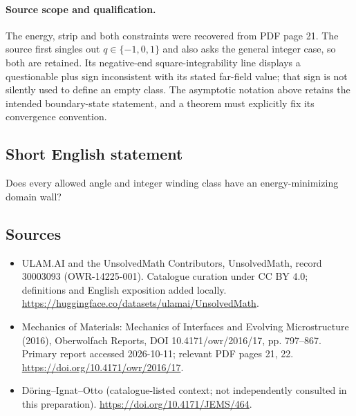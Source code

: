 \documentclass[11pt]{article}
\begin{document}
\paragraph{Source scope and qualification.}
The energy, strip and both constraints were recovered from PDF page 21. The source first singles out $q\in\{-1,0,1\}$ and also asks the general integer case, so both are retained. Its negative-end square-integrability line displays a questionable plus sign inconsistent with its stated far-field value; that sign is not silently used to define an empty class. The asymptotic notation above retains the intended boundary-state statement, and a theorem must explicitly fix its convergence convention.
\subsection{Short English statement}
Does every allowed angle and integer winding class have an energy-minimizing domain wall?
\subsection{Sources}
\begin{itemize}
\item[\hypertarget{source:30003093:1}{S1}] ULAM.AI and the UnsolvedMath Contributors, UnsolvedMath, record 30003093 (OWR-14225-001). Catalogue curation under CC BY 4.0; definitions and English exposition added locally.
\url{https://huggingface.co/datasets/ulamai/UnsolvedMath}.
\item[\hypertarget{source:30003093:2}{S2}] Mechanics of Materials: Mechanics of Interfaces and Evolving Microstructure (2016), Oberwolfach Reports, DOI 10.4171/owr/2016/17, pp. 797--867. Primary report accessed 2026-10-11; relevant PDF pages 21, 22.
\url{https://doi.org/10.4171/owr/2016/17}.
\item[\hypertarget{source:30003093:3}{S3}] Döring--Ignat--Otto (catalogue-listed context; not independently consulted in this preparation).
\url{https://doi.org/10.4171/JEMS/464}.
\end{itemize}
\label{end:30003093}
\end{document}
